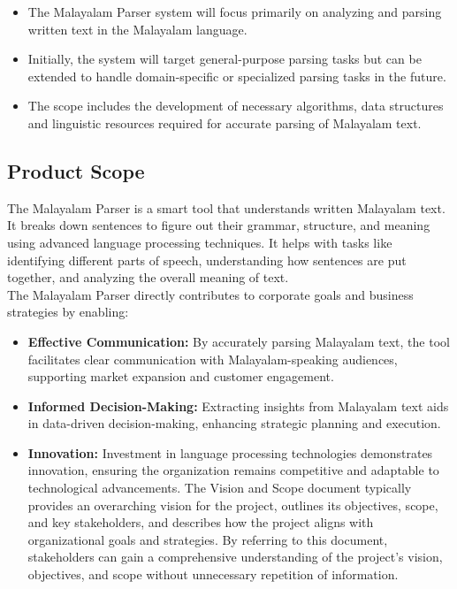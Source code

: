 \documentclass[12pt]{article}
\begin{document}
	\begin{itemize}[label=-]
		\item The Malayalam Parser system will focus primarily on analyzing and parsing written text in the Malayalam language.
		\item Initially, the system will target general-purpose parsing tasks but can be extended to handle domain-specific or specialized parsing tasks in the future.
		\item The scope includes the development of necessary algorithms, data structures and linguistic resources required for accurate parsing of Malayalam text.
	\end{itemize}
	
	\subsection{Product Scope}
	The Malayalam Parser is a smart tool that understands written Malayalam text. It breaks
	down sentences to figure out their grammar, structure, and meaning using advanced
	language processing techniques. It helps with tasks like identifying different parts of
	speech, understanding how sentences are put together, and analyzing the overall meaning
	of text.\\
	The Malayalam Parser directly contributes to corporate goals and business strategies by
	enabling:
	
	\begin{itemize}[label=-]
		\item \textbf{Effective Communication:} By accurately parsing Malayalam text, the tool facilitates clear communication with Malayalam-speaking audiences, supporting
		market expansion and customer engagement.
		
		\item \textbf{Informed Decision-Making:} Extracting insights from Malayalam text aids in	data-driven decision-making, enhancing strategic planning and execution.
		
		\item \textbf{Innovation:} Investment in language processing technologies demonstrates innovation, ensuring the organization remains competitive and adaptable to technological advancements. The Vision and Scope document typically provides an	overarching vision for the project, outlines its objectives, scope, and key	stakeholders, and describes how the project aligns with organizational goals and strategies. By referring to this document, stakeholders can gain a comprehensive understanding of the project's vision, objectives, and scope without unnecessary	repetition of information.
	\end{itemize}
\end{document}
